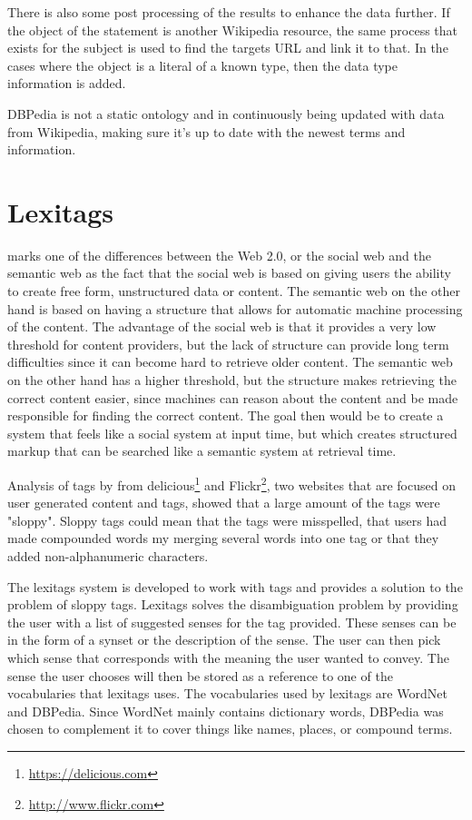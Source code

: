 There is also some post processing of the results to enhance the data further.
If the object of the statement is another Wikipedia resource,
the same process that exists for the subject is used to find the targets URL and link it to that.
In the cases where the object is a literal of a known type, then the data type information is added.

DBPedia is not a static ontology and in continuously being updated with data from Wikipedia,
making sure it's up to date with the newest terms and information.



\section{Lexitags}
\label{Lexitags}
\citet{Veres2011} marks one of the differences between the Web 2.0, or the social web and the semantic web as the
fact that the social web is based on giving users the ability to create free form, unstructured data or content.
The semantic web on the other hand is based on having a structure that allows for automatic machine processing of the content.
The advantage of the social web is that it provides a very low threshold for content providers,
but the lack of structure can provide long term difficulties since it can become hard to retrieve older content.
The semantic web on the other hand has a higher threshold,
but the structure makes retrieving the correct content easier,
since machines can reason about the content and be made responsible for finding the correct content.
The goal then would be to create a system that feels like a social system at input time,
but which creates structured markup that can be searched like a semantic system at retrieval time.

Analysis of tags by \citet{Tonkin2006} from delicious\footnote{\url{https://delicious.com}} and Flickr\footnote{\url{http://www.flickr.com}},
two websites that are focused on user generated content and tags,
showed that a large amount of the tags were "sloppy".
Sloppy tags could mean that the tags were misspelled,
that users had made compounded words my merging several words into one tag
or that they added non-alphanumeric characters.

The lexitags system is developed to work with tags and provides a solution to the problem of sloppy tags.
Lexitags solves the disambiguation problem by providing the user with a list of suggested senses for the tag provided.
These senses can be in the form of a synset or the description of the sense.
The user can then pick which sense that corresponds with the meaning the user wanted to convey\citep{Veres2011}.
The sense the user chooses will then be stored as a reference to one of the vocabularies that lexitags uses.
The vocabularies used by lexitags are WordNet and DBPedia.
Since WordNet mainly contains dictionary words,
DBPedia was chosen to complement it to cover things like names, places, or compound terms.


